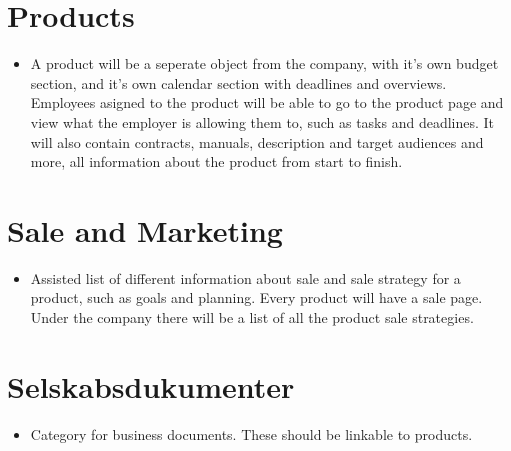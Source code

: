 \section{Products}
\begin{itemize}
	\item A product will be a seperate object from the company, with it's own budget section, and it's own calendar section with deadlines and overviews. Employees asigned to the product will be able to go to the product page and view what the employer is allowing them to, such as tasks and deadlines. It will also contain contracts, manuals, description and target audiences and more, all information about the product from start to finish.
\end{itemize}

\section{Sale and Marketing}
\begin{itemize}
	\item Assisted list of different information about sale and sale strategy for a product, such as goals and planning. Every product will have a sale page. Under the company there will be a list of all the product sale strategies.
\end{itemize}

\section{Selskabsdukumenter}
\begin{itemize}
	\item Category for business documents. These should be linkable to products.
\end{itemize}